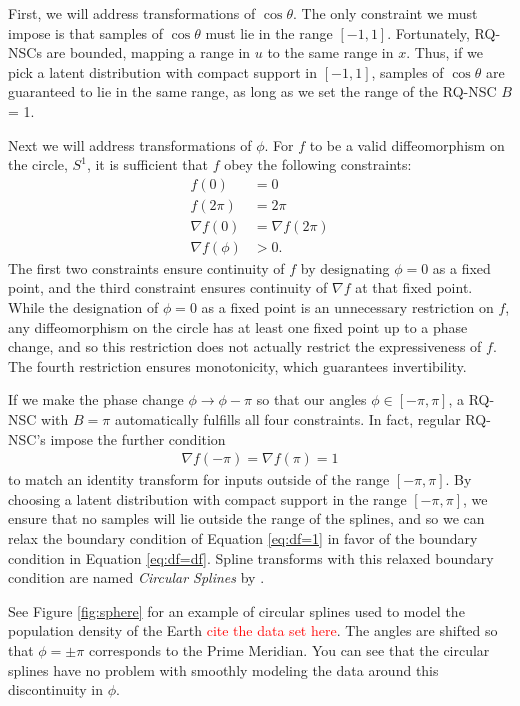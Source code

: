 \documentclass[twocolumn]{aastex631}
\newcommand{\note}[1]{\textsf{\textcolor{red}{#1}}}
\begin{document}
First, we will address transformations of $\cos\theta$.
The only constraint we must impose is that samples of $\cos\theta$ must lie in the range $[-1, 1]$.
Fortunately, RQ-NSCs are bounded, mapping a range in $u$ to the same range in $x$.
Thus, if we pick a latent distribution with compact support in $[-1, 1]$, samples of $\cos\theta$ are guaranteed to lie in the same range, as long as we set the range of the RQ-NSC $B$ = 1.

Next we will address transformations of $\phi$.
For $f$ to be a valid diffeomorphism on the circle, $S^1$, it is sufficient that $f$ obey the following constraints:
\begin{align}
    f(0) &= 0 \\
    f(2\pi) &= 2\pi \\
    \nabla f(0) &= \nabla f(2\pi) \label{eq:df=df} \\
    \nabla f(\phi) &> 0.
\end{align}
The first two constraints ensure continuity of $f$ by designating $\phi=0$ as a fixed point, and the third constraint ensures continuity of $\nabla f$ at that fixed point.
While the designation of $\phi=0$ as a fixed point is an unnecessary restriction on $f$, any diffeomorphism on the circle has at least one fixed point up to a phase change, and so this restriction does not actually restrict the expressiveness of $f$.
The fourth restriction ensures monotonicity, which guarantees invertibility.

If we make the phase change $\phi \to \phi - \pi$ so that our angles $\phi \in [-\pi, \pi]$, a RQ-NSC with $B=\pi$ automatically fulfills all four constraints.
In fact, regular RQ-NSC's impose the further condition
\begin{align}
    \nabla f(-\pi) = \nabla f(\pi) = 1 \label{eq:df=1}
\end{align}
to match an identity transform for inputs outside of the range $[-\pi, \pi]$.
By choosing a latent distribution with compact support in the range $[-\pi, \pi]$, we ensure that no samples will lie outside the range of the splines, and so we can relax the boundary condition of Equation \ref{eq:df=1} in favor of the boundary condition in Equation \ref{eq:df=df}.
Spline transforms with this relaxed boundary condition are named \emph{Circular Splines} by \citet{rezende2020}.

See Figure \ref{fig:sphere} for an example of circular splines used to model the population density of the Earth \note{cite the data set here}.
The angles are shifted so that $\phi=\pm \pi$ corresponds to the Prime Meridian.
You can see that the circular splines have no problem with smoothly modeling the data around this discontinuity in $\phi$.
\end{document}
